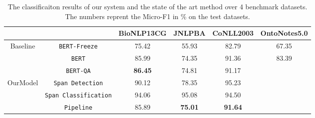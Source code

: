 \begin{table}[h!]
\centering
\begin{small}
\begin{tabular}{cccccc}\toprule
      &  \textbf{} & BioNLP13CG & JNLPBA & CoNLL2003 & OntoNotes5.0\\\toprule
\multirow{3}{*}{Baseline} & \texttt{BERT-Freeze} &  75.42 & 55.93 & 82.79 & 67.35 \\
                          & \texttt{BERT} & 85.99 & 74.35 & 91.36 & 83.39 \\ 
                          & \texttt{BERT-QA} & \textbf{86.45} & 74.81 & 91.17 & \\\midrule
\multirow{3}{*}{OurModel} &        \texttt{Span Detection} & 90.12 & 78.35 & 95.23 & \\
        & \texttt{Span Classification} & 94.06 & 95.08 & 94.50 & \\
        & \texttt{Pipeline} & 85.89 & \textbf{75.01} & \textbf{91.64} & \\ \bottomrule
\end{tabular}
\caption{The classificaiton results of our system and the state of the art method over 4 benchmark datasets. 
     The numbers reprent the Micro-F1 in \% on the test datasets.}
    \label{tab:res_span}
\end{small}
\end{table}


